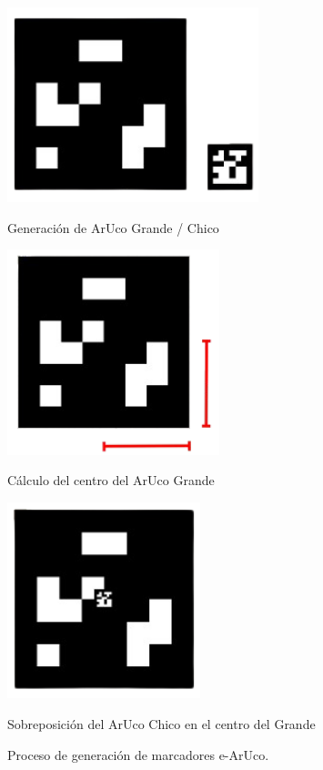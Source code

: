     \begin{figure}[h!]
        \centering
        \begin{minipage}{0.3\textwidth}
            \centering
            \includegraphics[width=0.65\textwidth]{pictures/pose_1.png}
            \caption{Generación de ArUco Grande / Chico}
            \label{fig:imagen1}
        \end{minipage}
        \hfill
        \begin{minipage}{0.3\textwidth}
            \centering
            \includegraphics[width=0.55\textwidth]{pictures/pose_2.png}
            \caption{Cálculo del centro del ArUco Grande}
            \label{fig:imagen2}
        \end{minipage}
        \hfill
        \begin{minipage}{0.3\textwidth}
            \centering
            \includegraphics[width=0.5\textwidth]{pictures/pose_3.png}
            \caption{Sobreposición del ArUco Chico en el centro del Grande}
            \label{fig:imagen2}
        \end{minipage}
        \caption{Proceso de generación de marcadores e-ArUco.}
    \end{figure}

